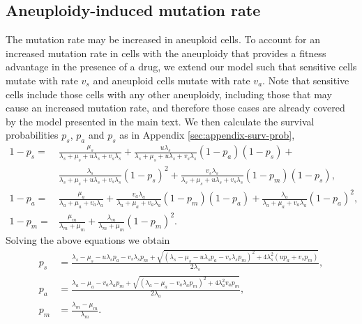 \documentclass[12pt]{extarticle}
\begin{document}
\begin{appendices}
\section{Aneuploidy-induced mutation rate}\label{sec:appendix-diff-mut}
The mutation rate may be increased in aneuploid cells. 
To account for an increased mutation rate in cells with the aneuploidy that provides a fitness advantage in the presence of a drug, we extend our model such that sensitive cells mutate with rate $v_s$ and aneuploid cells mutate with rate $v_a$. Note that sensitive cells include those cells with any other aneuploidy, including those that may cause an increased mutation rate, and therefore those cases are already covered by the model presented in the main text.
We then calculate the survival probabilities $p_s$, $p_a$ and $p_s$ as in Appendix \ref{sec:appendix-surv-prob},
\begin{equation} \label{eq:extinction_prob_ane}
\begin{aligned}
1-p_s = &\frac{\mu_s}{\lambda_s+\mu_s+u\lambda_s+v_s\lambda_s} + 
		  \frac{u\lambda_s}{\lambda_s+\mu_s+u\lambda_s+v_s\lambda_s}\left(1-p_a\right)\left(1-p_s\right) + \\
		  & \frac{\lambda_s}{\lambda_s+\mu_s+u\lambda_s+v_s\lambda_s}\left(1-p_s\right)^2 +
		  \frac{v_s\lambda_s}{\lambda_s+\mu_s+u\lambda_s+v_s\lambda_s}\left(1-p_m\right)\left(1-p_s\right) ,\\
1-p_a = &\frac{\mu_a}{\lambda_a+\mu_a+v_a\lambda_a}+\frac{v_a\lambda_a}{\lambda_a+\mu_a+v_a\lambda_a}\left(1-p_m\right)\left(1-p_a\right)+\frac{\lambda_a}{\lambda_a+\mu_a+v_a\lambda_a}\left(1-p_a\right)^2 ,\\
1-p_m = &\frac{\mu_m}{\lambda_m+\mu_m}+\frac{\lambda_m}{\lambda_m+\mu_m}\left(1-p_m\right)^2 .	 
\end{aligned}
\end{equation}
Solving the above equations we obtain
\begin{equation}\label{eq:survival_prob_ane}
\begin{aligned}
p_s &= \frac{\lambda_s-\mu_s-u\lambda_sp_a-v_s\lambda_sp_m+\sqrt{\left(\lambda_s-\mu_s-u\lambda_sp_a-v_s\lambda_sp_m\right)^2+4\lambda_s^2\left(up_a+v_sp_m\right)}}{2\lambda_s} ,\\
p_a &= \frac{\lambda_a-\mu_a-v_a\lambda_ap_m+\sqrt{\left(\lambda_a-\mu_a-v_a\lambda_ap_m\right)^2+4\lambda_a^2v_ap_m}}{2\lambda_a}, \\
p_m &= \frac{\lambda_m-\mu_m}{\lambda_m} .
\end{aligned} 
\end{equation}

\end{appendices}
\end{document}
